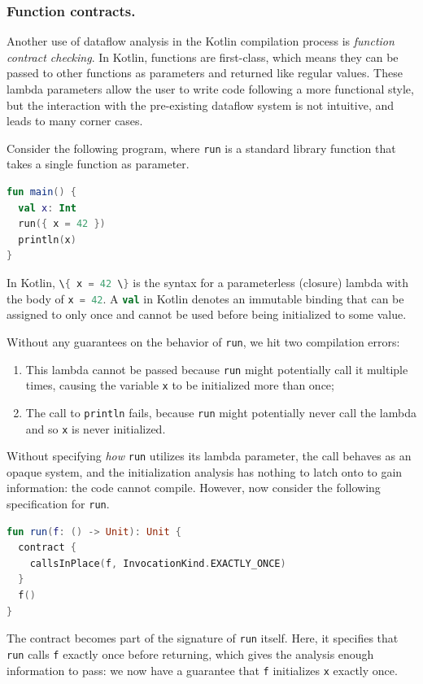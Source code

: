 \documentclass[runningheads]{llncs}
\newcommand{\kt}[1]{\lstinline[language=Kotlin]|#1|}
\begin{document}
\subsubsection{Function contracts.}
Another use of dataflow analysis in the Kotlin compilation process is \emph{function contract checking}. In Kotlin, functions are first-class, which means they can be passed to other functions as parameters and returned like regular values. These lambda parameters allow the user to write code following a more functional style, but the interaction with the pre-existing dataflow system is not intuitive, and leads to many corner cases.

Consider the following program, where \kt{run} is a standard library function that takes a single function as parameter.

\begin{lstlisting}[language=Kotlin]
fun main() {
  val x: Int
  run({ x = 42 })
  println(x)
}
\end{lstlisting}

In Kotlin, \kt{\{ x = 42 \}} is the syntax for a parameterless (closure) lambda with the body of \kt{x = 42}. A \kt{val} in Kotlin denotes an immutable binding that can be assigned to only once and cannot be used before being initialized to some value.

Without any guarantees on the behavior of \kt{run}, we hit two compilation errors:
\begin{enumerate}
  \item This lambda cannot be passed because \kt{run} might potentially call it multiple times, causing the variable \kt{x} to be initialized more than once;
  \item The call to \kt{println} fails, because \kt{run} might potentially never call the lambda and so \kt{x} is never initialized.
\end{enumerate}
Without specifying \emph{how} \kt{run} utilizes its lambda parameter, the call behaves as an opaque system, and the initialization analysis has nothing to latch onto to gain information: the code cannot compile. However, now consider the following specification for \kt{run}.

\begin{lstlisting}[language=Kotlin]
fun run(f: () -> Unit): Unit {
  contract {
    callsInPlace(f, InvocationKind.EXACTLY_ONCE)
  }
  f()
}
\end{lstlisting}

The contract becomes part of the signature of \kt{run} itself. Here, it specifies that \kt{run} calls \kt{f} exactly once before returning, which gives the analysis enough information to pass: we now have a guarantee that \kt{f} initializes \kt{x} exactly once.
\end{document}
